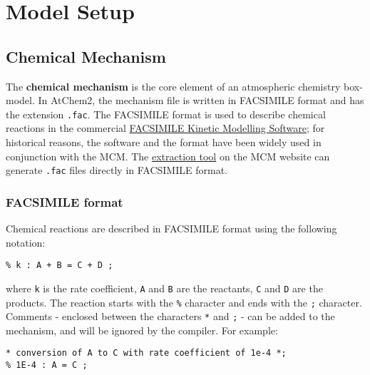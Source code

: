 %
%
%
%
\chapter{Model Setup} \label{ch:setup}

\section{Chemical Mechanism} \label{sec:mechanism}

The \textbf{chemical mechanism} is the core element of an atmospheric
chemistry box-model. In AtChem2, the mechanism file is written in
FACSIMILE format and has the extension \texttt{.fac}. The FACSIMILE
format is used to describe chemical reactions in the commercial
\href{http://www.mcpa-software.com/}{FACSIMILE Kinetic Modelling
  Software}; for historical reasons, the software and the format have
been widely used in conjunction with the MCM. The
\href{http://mcm.leeds.ac.uk/MCMv3.3.1/extract.htt}{extraction tool}
on the MCM website can generate \texttt{.fac} files directly in
FACSIMILE format.

\subsection{FACSIMILE format} \label{subsec:facsimile-format}

Chemical reactions are described in FACSIMILE format using the
following notation:

\begin{verbatim}
% k : A + B = C + D ;
\end{verbatim}

where \texttt{k} is the rate coefficient, \texttt{A} and \texttt{B}
are the reactants, \texttt{C} and \texttt{D} are the products. The
reaction starts with the \texttt{\%} character and ends with the
\texttt{;} character. Comments - enclosed between the characters
\texttt{*} and \texttt{;} - can be added to the mechanism, and will be
ignored by the compiler. For example:

\begin{verbatim}
* conversion of A to C with rate coefficient of 1e-4 *;
% 1E-4 : A = C ;
\end{verbatim}

